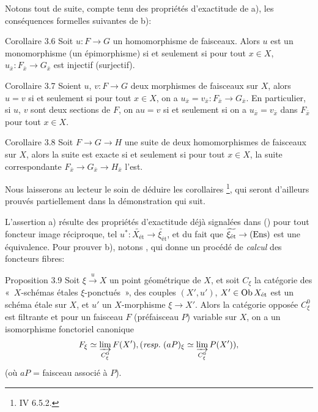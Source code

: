 \documentclass[10pt]{../fichiers-configuration-latex/smfart}
\begin{document}
Notons tout de suite, compte tenu des propriétés d'exactitude de a),
les conséquences formelles suivantes de b):

\begin{enonce*}{Corollaire 3.6}
Soit $u : F \to G$ un homomorphisme de faisceaux. Alors $u$ est un
monomorphisme (\resp un épimorphisme) si et seulement si pour tout $x
\in X$, $u_{\bar{x}}:F_{\bar{x}}\to G_{\bar{x}}$ est injectif
(\resp surjectif).
\end{enonce*}

\begin{enonce*}{Corollaire 3.7}
Soient $u$, $v : F \to G$ deux morphismes de faisceaux sur $X$, alors
$u = v$ si et seulement si pour tout $x \in X$, on a $u_{\bar{x}} =
v_{\bar{x}} : F_{\bar{x}} \to G_{\bar{x}}$. En particulier, si $u$,
$v$ sont deux sections de $F$, on a\pageoriginale  $u = v$ si et
seulement si on a
$u_{\bar{x}} = v_{\bar{x}}$ dans $F_{\bar{x}}$ pour tout $x \in X$.
\end{enonce*}

\begin{enonce*}{Corollaire 3.8}
Soit $F \to G \to H$ une suite de deux homomorphismes de faisceaux sur
$X$, alors la suite est exacte si et seulement si pour tout $x \in X$,
la suite correspondante $F_{\bar{x}} \to G_{\bar{x}} \to H_{\bar{x}}$
l'est.
\end{enonce*}

Nous laisserons au lecteur le soin de déduire les corollaires
\footnote{\Cf IV 6.5.2.}, %
qui seront d'ailleurs prouvés partiellement
dans la démonstration qui suit.

L'assertion a) résulte des propriétés d'exactitude déjà signalées
dans () pour tout foncteur image réciproque, tel
$u^{\ast} : \widetilde{X_{\text{ét}}} \to
\widetilde{\xi_{\text{ét}}}$, et du fait que
$\widetilde{\xi_{\text{ét}}} \to (\Ens)$ est une équivalence. Pour
prouver b), notons , qui donne un procédé de
\emph{calcul} des foncteurs fibres:

\begin{enonce*}{Proposition 3.9\footnotemark}
Soit $\xi \xrightarrow{u} X$ un point
géométrique de $X$, et soit $C_{\xi}$ la catégorie des « $X$-schémas étales $\xi$-ponctués », \ie des couples $(X', u')$, 
$X'\in \operatorname{Ob} X_{\text{\rm ét}}$ est un schéma étale sur $X$, et $u'$ un
$X$-morphisme $\xi \to X'$. Alors la catégorie opposée $C^{0}_{\xi}$
est filtrante et pour un faisceau $F$ (\resp préfaisceau $P$)
variable sur $X$, on a un isomorphisme fonctoriel canonique
$$
F_{\xi} \simeq \varinjlim_{C^{0}_{\xi}} F(X'), (\emph{resp.\kern.3em}
(aP)_{\xi} \simeq \varinjlim_{C^{0}_{\xi}} P(X')){},
$$
(où $aP$ = faisceau associé à $P$).
\end{enonce*}
\end{document}
